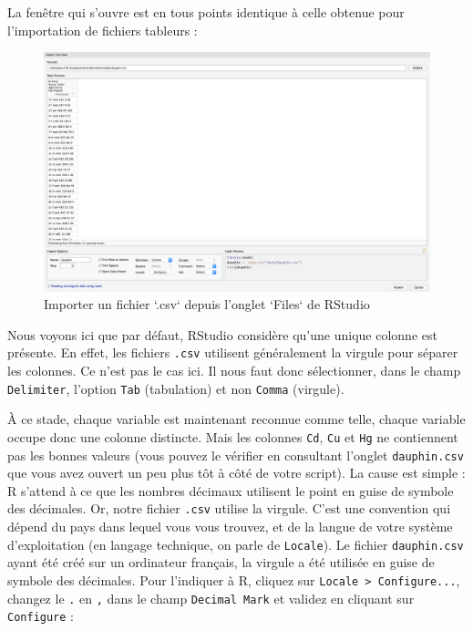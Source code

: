 \documentclass[a4paperpaper,]{article}
\begin{document}
La fenêtre qui s'ouvre est en tous points identique à celle obtenue pour l'importation de fichiers tableurs :

\begin{figure}[htpb]

{\centering \includegraphics[width=1\linewidth]{images/importcsv2} 

}

\caption{Importer un fichier `.csv` depuis l'onglet `Files` de RStudio}\label{fig:importcsv2}
\end{figure}

Nous voyons ici que par défaut, RStudio considère qu'une unique colonne est présente. En effet, les fichiers \texttt{.csv} utilisent généralement la virgule pour séparer les colonnes. Ce n'est pas le cas ici. Il nous faut donc sélectionner, dans le champ \texttt{Delimiter}, l'option \texttt{Tab} (tabulation) et non \texttt{Comma} (virgule).

À ce stade, chaque variable est maintenant reconnue comme telle, chaque variable occupe donc une colonne distincte. Mais les colonnes \texttt{Cd}, \texttt{Cu} et \texttt{Hg} ne contiennent pas les bonnes valeurs (vous pouvez le vérifier en consultant l'onglet \texttt{dauphin.csv} que vous avez ouvert un peu plus tôt à côté de votre script). La cause est simple : R s'attend à ce que les nombres décimaux utilisent le point en guise de symbole des décimales. Or, notre fichier \texttt{.csv} utilise la virgule. C'est une convention qui dépend du pays dans lequel vous vous trouvez, et de la langue de votre système d'exploitation (en langage technique, on parle de \texttt{Locale}). Le fichier \texttt{dauphin.csv} ayant été créé sur un ordinateur français, la virgule a été utilisée en guise de symbole des décimales. Pour l'indiquer à R, cliquez sur \texttt{Locale\ \textgreater{}\ Configure...}, changez le \texttt{.} en \texttt{,} dans le champ \texttt{Decimal\ Mark} et validez en cliquant sur \texttt{Configure} :
\end{document}
